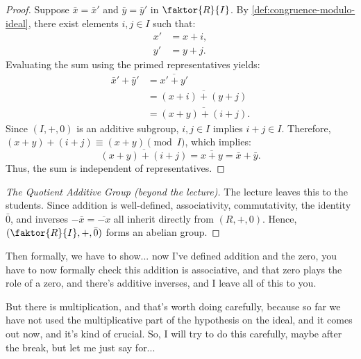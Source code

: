 \begin{content}

\begin{proof}
Suppose $\bar{x} = \bar{x}'$ and $\bar{y} = \bar{y}'$ in $\faktor{R}{I}$. By \cref{def:congruence-modulo-ideal}, there exist elements $i, j \in I$ such that:
\begin{align}
x' &= x + i, \label{eq:x-prime-shift} \\
y' &= y + j. \label{eq:y-prime-shift}
\end{align}
Evaluating the sum using the primed representatives yields:
\begin{align*}
\bar{x}' + \bar{y}' &= \overline{x' + y'} \\
&= \overline{(x + i) + (y + j)} \\
&= \overline{(x + y) + (i + j)}.
\end{align*}
Since $(I, +, 0)$ is an additive subgroup, $i, j \in I$ implies $i + j \in I$. Therefore, $(x + y) + (i + j) \equiv (x + y) \pmod I$, which implies:
\[
\overline{(x + y) + (i + j)} = \overline{x + y} = \bar{x} + \bar{y}.
\]
Thus, the sum is independent of representatives.
\end{proof}

\begin{proof}[The Quotient Additive Group (beyond the lecture)]
The lecture leaves this to the students. Since addition is well-defined, associativity, commutativity, the identity $\bar{0}$, and inverses $-\bar{x} = \overline{-x}$ all inherit directly from $(R, +, 0)$. Hence, $(\faktor{R}{I}, +, \bar{0})$ forms an abelian group.
\end{proof}
\end{content}

\begin{speech}[00:42:05 - 00:43:13]
Then formally, we have to show... now I've defined addition and the zero, you have to now formally check this addition is associative, and that zero plays the role of a zero, and there's additive inverses, and I leave all of this to you. 

But there is multiplication, and that's worth doing carefully, because so far we have not used the multiplicative part of the hypothesis on the ideal, and it comes out now, and it's kind of crucial. So, I will try to do this carefully, maybe after the break, but let me just say for...
\end{speech}

